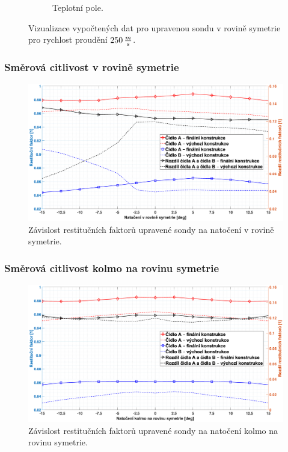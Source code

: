 \begin{figure}[ht!]
\begin{subfigure}{0.45\textwidth}
                    \caption{Teplotní pole.}
                \end{subfigure}
                \caption{Vizualizace vypočtených dat pro upravenou sondu v rovině symetrie pro rychlost proudění $250 \, \frac{m}{s}$.}
                \label{fig:sonda-final-vizualizace}
            \end{figure}
        \subsubsection{Směrová citlivost v rovině symetrie}
            \begin{figure}[ht!]
                \centering
                \includegraphics*[width=\textwidth, trim={5.9cm 1.0cm 2.7cm 2.0cm}]{500_FINAL/final_XY.eps}
                \caption{Závislost restitučních faktorů upravené sondy na natočení v rovině symetrie.}
                \label{fig:sonda-final-symetrie}
            \end{figure}
        \subsubsection{Směrová citlivost kolmo na rovinu symetrie}
            \begin{figure}[ht!]
                \centering
                \includegraphics*[width=\textwidth, trim={5.9cm 1.0cm 2.7cm 2.0cm}]{500_FINAL/final_XZ.eps}
                \caption{Závislost restitučních faktorů upravené sondy na natočení kolmo na rovinu symetrie.}
                \label{fig:sonda-final-kolma-rovina}
            \end{figure}
